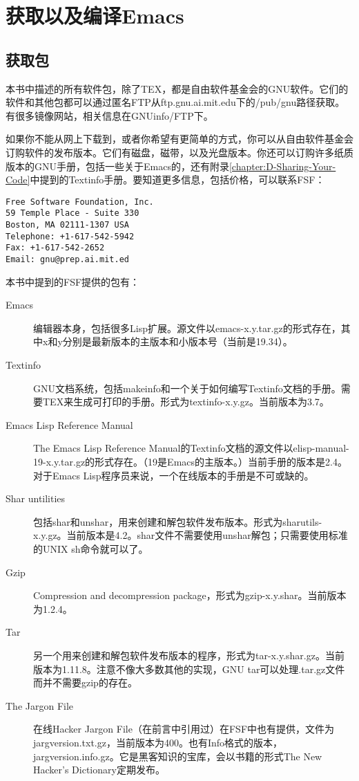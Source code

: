 \chapter{获取以及编译Emacs}
\label{chapter:E-Obtaining-and-Building-Emacs}


\section{获取包}
\label{section:E-Availability-of-Packages}

本书中描述的所有软件包，除了TEX，都是自由软件基金会的GNU软件。它们的软件和其他包都可以通过匿名FTP从ftp.gnu.ai.mit.edu下的/pub/gnu路径获取。有很多镜像网站，相关信息在GNUinfo/FTP下。

如果你不能从网上下载到，或者你希望有更简单的方式，你可以从自由软件基金会订购软件的发布版本。它们有磁盘，磁带，以及光盘版本。你还可以订购许多纸质版本的GNU手册，包括一些关于Emacs的，还有附录\ref{chapter:D-Sharing-Your-Code}中提到的Textinfo手册。要知道更多信息，包括价格，可以联系FSF：

\begin{verbatim}
Free Software Foundation, Inc.
59 Temple Place - Suite 330
Boston, MA 02111-1307 USA
Telephone: +1-617-542-5942
Fax: +1-617-542-2652
Email: gnu@prep.ai.mit.ed
\end{verbatim}

本书中提到的FSF提供的包有：

\begin{description}
  \item[Emacs] 编辑器本身，包括很多Lisp扩展。源文件以emacs-x.y.tar.gz的形式存在，其中x和y分别是最新版本的主版本和小版本号（当前是19.34）。
  \item[Textinfo] GNU文档系统，包括makeinfo和一个关于如何编写Textinfo文档的手册。需要TEX来生成可打印的手册。形式为textinfo-x.y.gz。当前版本为3.7。
  \item[Emacs Lisp Reference Manual] The Emacs Lisp Reference Manual的Textinfo文档的源文件以elisp-manual-19-x.y.tar.gz的形式存在。（19是Emacs的主版本。）当前手册的版本是2.4。对于Emacs Lisp程序员来说，一个在线版本的手册是不可或缺的。
  \item[Shar untilities] 包括shar和unshar，用来创建和解包软件发布版本。形式为sharutils-x.y.gz。当前版本是4.2。shar文件不需要使用unshar解包；只需要使用标准的UNIX sh命令就可以了。
  \item[Gzip] Compression and decompression package，形式为gzip-x.y.shar。当前版本为1.2.4。
  \item[Tar] 另一个用来创建和解包软件发布版本的程序，形式为tar-x.y.shar.gz。当前版本为1.11.8。注意不像大多数其他的实现，GNU tar可以处理.tar.gz文件而并不需要gzip的存在。
  \item[The Jargon File] 在线Hacker Jargon File（在前言中引用过）在FSF中也有提供，文件为jargversion.txt.gz，当前版本为400。也有Info格式的版本，jargversion.info.gz。它是黑客知识的宝库，会以书籍的形式The New Hacker's Dictionary定期发布。
\end{description}

